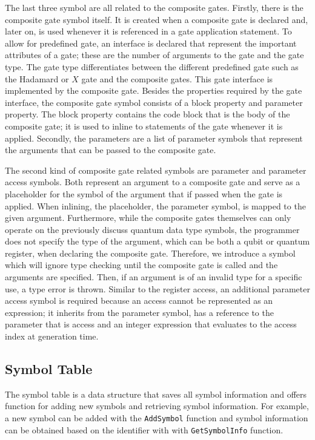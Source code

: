 The last three symbol are all related to the composite gates. Firstly, there is the composite gate symbol itself. It is created when a composite gate is declared and, later on, is used whenever it is referenced in a gate application statement. To allow for predefined gate, an interface is declared that represent the important attributes of a gate; these are the number of arguments to the gate and the gate type. The gate type differentiates between the different predefined gate such as the Hadamard or $X$ gate and the composite gates. This gate interface is implemented by the composite gate. Besides the properties required by the gate interface, the composite gate symbol consists of a block property and parameter property. The block property contains the code block that is the body of the composite gate; it is used to inline to statements of the gate whenever it is applied. Secondly, the parameters are a list of parameter symbols that represent the arguments that can be passed to the composite gate.   

The second kind of composite gate related symbols are parameter and parameter access symbols. Both represent an argument to a composite gate and serve as a placeholder for the symbol of the argument that if passed when the gate is applied. When inlining, the placeholder, \ie the parameter symbol, is mapped to the given argument. Furthermore, while the composite gates themselves can only operate on the previously discuss quantum data type symbols, the programmer does not specify the type of the argument, which can be both a qubit or quantum register, when declaring the composite gate. Therefore, we introduce a symbol which will ignore type checking until the composite gate is called and the arguments are specified. Then, if an argument is of an invalid type for a specific use, a type error is thrown. Similar to the register access, an additional parameter access symbol is required because an access cannot be represented as an expression; it inherits from the parameter symbol, has a reference to the parameter that is access and an integer expression that evaluates to the access index at generation time.

\subsection{Symbol Table}
\label{sec:implementation_symbolTable}
The symbol table is a data structure that saves all symbol information and offers function for adding new symbols and retrieving symbol information. For example, a new symbol can be added with the \texttt{AddSymbol} function and symbol information can be obtained based on the identifier with with \texttt{GetSymbolInfo} function.

